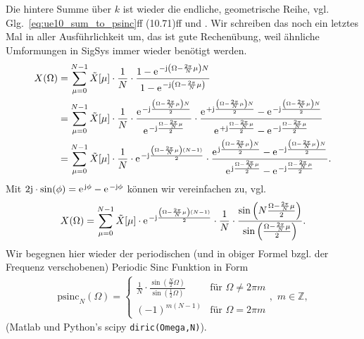 \begin{ExCalc}
Die hintere Summe über $k$ ist wieder die endliche, geometrische Reihe,
vgl. Glg.~\eqref{eq:ue10_sum_to_psinc}ff (10.71)ff
und \cite[(3-39)]{Lyons2011}.
Wir schreiben das noch ein letztes Mal in aller Ausführlichkeit um, das ist gute Rechenübung,
weil ähnliche Umformungen in SigSys immer wieder benötigt werden.
%
\begin{align}
X(\Omega)&=\sum_{\mu=0}^{N-1}\tilde{X}[\mu]\cdot\frac{1}{N}\cdot\frac{1-\e^{-\im\left(\Omega-\frac{2\pi}{N}\mu\right)N}}{1-\e^{-\im\left(\Omega-\frac{2\pi}{N}\mu\right)}}\\
&=\sum_{\mu=0}^{N-1}\tilde{X}[\mu]\cdot\frac{1}{N}\cdot\frac{\e^{-\im\frac{\left(\Omega-\frac{2\pi}{N}\mu\right)N}{2}}}{\e^{-\im\frac{\Omega-\frac{2\pi}{N}\mu}{2}}}\cdot\frac{\e^{+\im\frac{\left(\Omega-\frac{2\pi}{N}\mu\right)N}{2}}-\e^{-\im\frac{\left(\Omega-\frac{2\pi}{N}\mu\right)N}{2}}}{\e^{+\im\frac{\Omega-\frac{2\pi}{N}\mu}{2}}-\e^{-\im\frac{\Omega-\frac{2\pi}{N}\mu}{2}}}\\
&=\sum_{\mu=0}^{N-1}\tilde{X}[\mu]\cdot\frac{1}{N}\cdot\e^{-\im\frac{\left(\Omega-\frac{2\pi}{N}\mu\right)(N-1)}{2}}\cdot\frac{\e^{\im\frac{\left(\Omega-\frac{2\pi}{N}\mu\right)N}{2}}-\e^{-\im\frac{\left(\Omega-\frac{2\pi}{N}\mu\right)N}{2}}}{\e^{\im\frac{\Omega-\frac{2\pi}{N}\mu}{2}}-\e^{-\im\frac{\Omega-\frac{2\pi}{N}\mu}{2}}}.
\end{align}
%
Mit $2\im\cdot\sin(\phi)=\e^{\im \phi}-\e^{-\im \phi}$ können wir vereinfachen
zu, vgl.~%
\cite[(2.142)]{Rabiner1975}
%
\begin{equation}
X(\Omega)=\sum_{\mu=0}^{N-1}\tilde{X}[\mu]\cdot\e^{-\im\frac{\left(\Omega-\frac{2\pi}{N}\mu\right)(N-1)}{2}}\cdot\frac{1}{N}\cdot\frac{\sin\left(N\frac{\Omega-\frac{2\pi}{N}\mu}{2}\right)}{\sin\left(\frac{\Omega-\frac{2\pi}{N}\mu}{2}\right)}.
\end{equation}
%
Wir begegnen hier wieder der periodischen (und in obiger Formel bzgl. der Frequenz verschobenen) Periodic Sinc Funktion in Form
%
\begin{align}
\text{psinc}_N(\Omega)=\begin{cases}\frac{1}{N}\cdot\frac{\sin\left(\frac{N}{2}\Omega\right)}{\sin\left(\frac{1}{2}\Omega\right)}&\text{für }\Omega\neq2\pi m\\
(-1)^{m(N-1)}&\text{für }\Omega=2\pi m\end{cases},\,\,m\in\mathbb{Z},
\end{align}
%
(Matlab und Python's scipy \texttt{diric(Omega,N)}).


\end{ExCalc}
